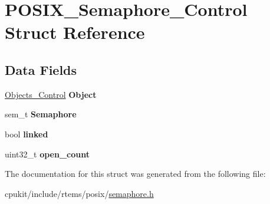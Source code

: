 \hypertarget{structPOSIX__Semaphore__Control}{}\section{P\+O\+S\+I\+X\+\_\+\+Semaphore\+\_\+\+Control Struct Reference}
\label{structPOSIX__Semaphore__Control}
\subsection*{Data Fields}
\begin{DoxyCompactItemize}
\item 
\mbox{\label{structPOSIX__Semaphore__Control_a01ae86fc82fffb7dda616bdb718bf085}} 
\mbox{\hyperlink{structObjects__Control}{Objects\+\_\+\+Control}} {\bfseries Object}
\item 
\mbox{\label{structPOSIX__Semaphore__Control_adb6581b86acd437913ebc448d8dfd4c2}} 
sem\+\_\+t {\bfseries Semaphore}
\item 
\mbox{\label{structPOSIX__Semaphore__Control_a93167277af773ecd8da5e5e83c230a67}} 
bool {\bfseries linked}
\item 
\mbox{\label{structPOSIX__Semaphore__Control_a3f9f787e391863413ecf1d7b55911c37}} 
uint32\+\_\+t {\bfseries open\+\_\+count}
\end{DoxyCompactItemize}


The documentation for this struct was generated from the following file\+:\begin{DoxyCompactItemize}
\item 
cpukit/include/rtems/posix/\mbox{\hyperlink{semaphore_8h}{semaphore.\+h}}\end{DoxyCompactItemize}
